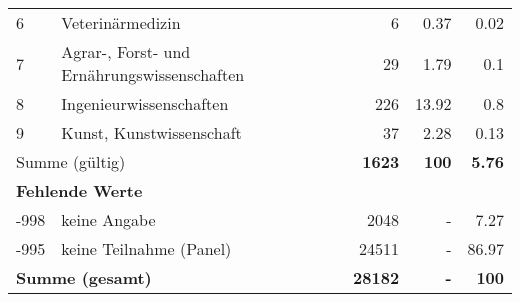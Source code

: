 \begin{longtable}{lXrrr}
     6 &
     \multicolumn{1}{X}{ Veterinärmedizin   } &


       \num{6} &
       \num[round-mode=places,round-precision=2]{0.37} &
         \num[round-mode=places,round-precision=2]{0.02} \\

     7 &
     \multicolumn{1}{X}{ Agrar-, Forst- und Ernährungswissenschaften   } &


       \num{29} &
       \num[round-mode=places,round-precision=2]{1.79} &
         \num[round-mode=places,round-precision=2]{0.1} \\

     8 &
     \multicolumn{1}{X}{ Ingenieurwissenschaften   } &


       \num{226} &
       \num[round-mode=places,round-precision=2]{13.92} &
         \num[round-mode=places,round-precision=2]{0.8} \\

     9 &
     \multicolumn{1}{X}{ Kunst, Kunstwissenschaft   } &


       \num{37} &
       \num[round-mode=places,round-precision=2]{2.28} &
         \num[round-mode=places,round-precision=2]{0.13} \\
     \midrule
     \multicolumn{2}{l}{Summe (gültig)} &
       \textbf{\num{1623}} &
     \textbf{\num{100}} &
       \textbf{\num[round-mode=places,round-precision=2]{5.76}} \\
     \multicolumn{5}{l}{\textbf{Fehlende Werte}}\\
       -998 &
       keine Angabe &
         \num{2048} &
        - &
         \num[round-mode=places,round-precision=2]{7.27} \\
       -995 &
       keine Teilnahme (Panel) &
         \num{24511} &
        - &
         \num[round-mode=places,round-precision=2]{86.97} \\
     \midrule
     \multicolumn{2}{l}{\textbf{Summe (gesamt)}} &
          \textbf{\num{28182}} &
        \textbf{-} &
        \textbf{\num{100}} \\
     \bottomrule
     \end{longtable}
     
